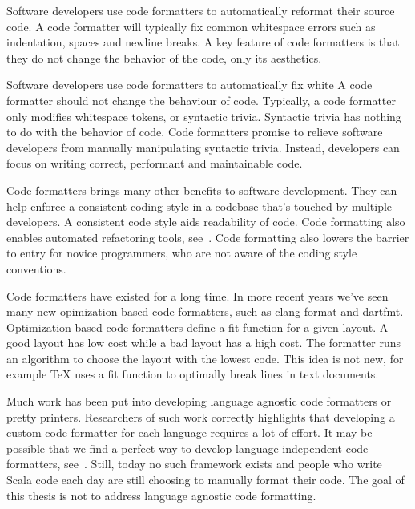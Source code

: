 \documentclass[11pt,a4paper]{article}
\begin{document}
Software developers use code formatters to automatically reformat their source code.
A code formatter will typically fix common whitespace errors such as indentation, spaces and newline breaks.
A key feature of code formatters is that they do not change the behavior of the code, only its aesthetics.










Software developers use code formatters to automatically fix white
A code formatter should not change the behaviour of code.
Typically, a code formatter only modifies whitespace tokens, or syntactic trivia.
Syntactic trivia has nothing to do with the behavior of code.
Code formatters promise to relieve software developers from manually manipulating
syntactic trivia.
Instead, developers can focus on writing correct, performant and maintainable code.

Code formatters brings many other benefits to software development.
They can help enforce a consistent coding style in a codebase that's touched by multiple developers.
A consistent code style aids readability of code.
Code formatting also enables automated refactoring tools, see~\autocite{wright_large-scale_2013}.
Code formatting also lowers the barrier to entry for novice programmers, who are not aware of the coding style conventions.

Code formatters have existed for a long time.
In more recent years we've seen many new opimization based code formatters, such as clang-format and dartfmt.
Optimization based code formatters define a fit function for a given layout.
A good layout has low cost while a bad layout has a high cost.
The formatter runs an algorithm to choose the layout with the lowest code.
This idea is not new, for example TeX uses a fit function to optimally break lines
in text documents.

Much work has been put into developing language agnostic code formatters or pretty printers.
Researchers of such work correctly highlights that developing a custom code formatter for each language requires a lot of effort.
It may be possible that we find a perfect way to develop language independent code formatters, see~\autocite{mps_article}.
Still, today no such framework exists and people who write Scala code each day are still choosing to manually format their code.
The goal of this thesis is not to address language agnostic code formatting.
\end{document}
